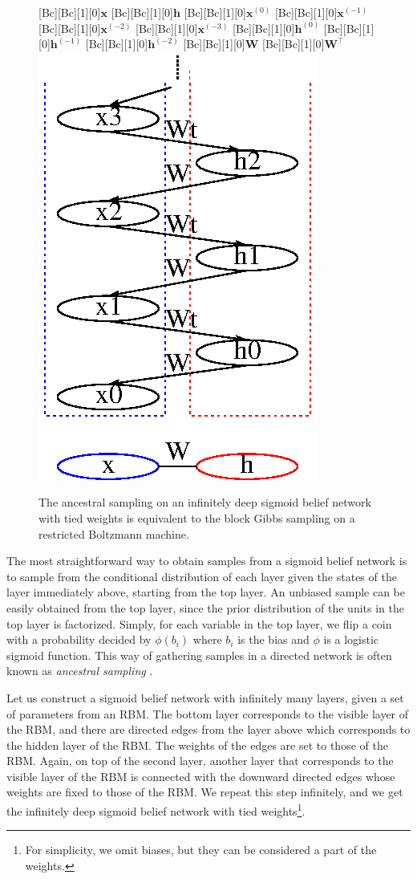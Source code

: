 \documentclass[dissertation,nocontribution,draft*]{aaltoseries}
\newcommand{\vect}[1]{\mathbf{#1}}
\newcommand{\matr}[1]{\mathbf{#1}}
\newcommand{\vh}[0]{\vect{h}}
\newcommand{\vx}[0]{\vect{x}}
\newcommand{\mW}[0]{\matr{W}}
\begin{document}
\begin{figure}
    \centering
    [Bc][Bc][1][0]{$\vx$}
    [Bc][Bc][1][0]{$\vh$}
    [Bc][Bc][1][0]{$\vx^{(0)}$}
    [Bc][Bc][1][0]{$\vx^{(-1)}$}
    [Bc][Bc][1][0]{$\vx^{(-2)}$}
    [Bc][Bc][1][0]{$\vx^{(-3)}$}
    [Bc][Bc][1][0]{$\vh^{(0)}$}
    [Bc][Bc][1][0]{$\vh^{(-1)}$}
    [Bc][Bc][1][0]{$\vh^{(-2)}$}
    [Bc][Bc][1][0]{$\mW$}
    [Bc][Bc][1][0]{$\mW^\top$}
    \includegraphics[width=0.4\columnwidth]{figures/rbm_dbn.eps}
    \caption{The ancestral sampling on an infinitely deep
    sigmoid belief network with tied weights is equivalent
    to the block Gibbs sampling on a restricted Boltzmann
    machine.}
    \label{fig:inf_sbn}
\end{figure}

The most straightforward way to obtain samples from a
sigmoid belief network is to sample from the conditional
distribution of each layer given the states of the layer
immediately above, starting from the top layer. An unbiased
sample can be easily obtained from the top layer, since the
prior distribution of the units in the top layer is
factorized. Simply, for each variable in the top layer, we
flip a coin with a probability decided by $\phi(b_i)$
where $b_i$ is the bias and $\phi$ is a logistic sigmoid
function. This way of gathering samples in a directed
network is often known as \textit{ancestral sampling}
\citep[see, e.g.,][]{Bishop2006,Murphy2012}.

Let us construct a sigmoid belief network with infinitely
many layers, given a set of parameters from an RBM. The bottom
layer corresponds to the visible layer of the RBM, and there
are directed edges from the layer above which corresponds to
the hidden layer of the RBM. The weights of the edges are
set to those of the RBM. Again, on top of the second layer,
another layer that corresponds to the visible layer of the
RBM is connected with the downward directed edges whose
weights are fixed to those of the RBM. We repeat this step
infinitely, and we get the infinitely deep sigmoid belief
network with tied weights\footnote{For simplicity, we
omit biases, but they can be considered a part of the
weights.}. 
\end{document}
